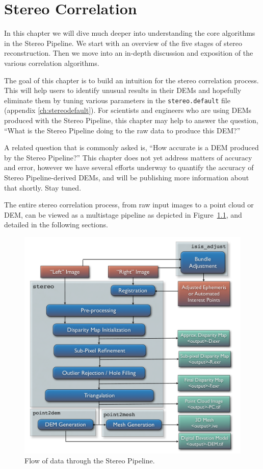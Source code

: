\chapter{Stereo Correlation}
\label{ch:correlation}

In this chapter we will dive much deeper into understanding the core
algorithms in the Stereo Pipeline.  We start with an overview of the
five stages of stereo reconstruction.  Then we move into an in-depth
discussion and exposition of the various correlation algorithms.

The goal of this chapter is to build an intuition for the stereo
correlation process.  This will help users to identify unusual results
in their \acp{DEM} and hopefully eliminate them by tuning various
parameters in the \texttt{stereo.default} file (appendix
\ref{ch:stereodefault}).  For scientists and
engineers who are using \acp{DEM} produced with the Stereo Pipeline, this
chapter may help to answer the question, ``What is the Stereo Pipeline
doing to the raw data to produce this \ac{DEM}?''

A related question that is commonly asked is, ``How accurate is a \ac{DEM}
produced by the Stereo Pipeline?''  This chapter does not yet address
matters of accuracy and error, however we have several efforts underway
to quantify the accuracy of Stereo Pipeline-derived \acp{DEM}, and will be
publishing more information about that shortly.  Stay tuned.

The entire stereo correlation process, from raw input images to a
point cloud or DEM, can be viewed as a multistage pipeline as depicted
in Figure~\ref{fig:asp}, and detailed in the following sections.

\begin{figure}[tb]
  \centering
  \includegraphics[width=13cm]{images/asp}
  \caption{Flow of data through the Stereo Pipeline.}
  \label{fig:asp}
\end{figure}

